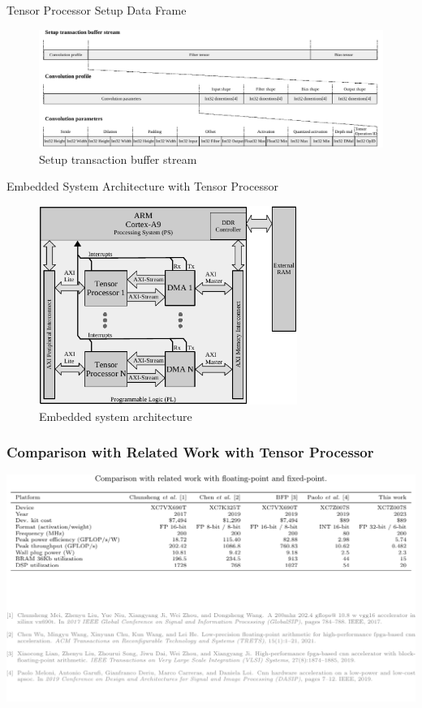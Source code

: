 \begin{frame}{Tensor Processor Setup Data Frame}
	
	\begin{figure}
		\includegraphics[width=\textwidth]{../figures/setup_transaction_buffer_stream.pdf}
		\caption{Setup transaction buffer stream}
	\end{figure}
	
\end{frame}


\begin{frame}{Embedded System Architecture with Tensor Processor}
	\begin{figure}
		\includegraphics[width=0.75\textwidth]{../chapters/cnn_accelerator/figures/system_design.pdf} %
		\caption{Embedded system architecture}
	\end{figure}
\end{frame}

\begin{frame}
	\frametitle{Comparison with Related Work with Tensor Processor} %
	\begin{center}
		\includegraphics[width=\textwidth]{slides/figures/cnn_related_work.pdf} %
	\end{center}
\end{frame}

\backupend